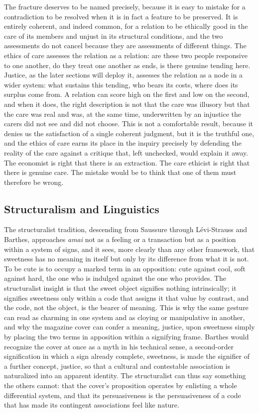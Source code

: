The fracture deserves to be named precisely, because it is easy to mistake for a contradiction to be resolved when it is in fact a feature to be preserved. It is entirely coherent, and indeed common, for a relation to be ethically good in the care of its members and unjust in its structural conditions, and the two assessments do not cancel because they are assessments of different things. The ethics of care assesses the relation as a relation: are these two people responsive to one another, do they treat one another as ends, is there genuine tending here. Justice, as the later sections will deploy it, assesses the relation as a node in a wider system: what sustains this tending, who bears its costs, where does its surplus come from. A relation can score high on the first and low on the second, and when it does, the right description is not that the care was illusory but that the care was real and was, at the same time, underwritten by an injustice the carers did not see and did not choose. This is not a comfortable result, because it denies us the satisfaction of a single coherent judgment, but it is the truthful one, and the ethics of care earns its place in the inquiry precisely by defending the reality of the care against a critique that, left unchecked, would explain it away. The economist is right that there is an extraction. The care ethicist is right that there is genuine care. The mistake would be to think that one of them must therefore be wrong.

\subsection{Structuralism and Linguistics}

The structuralist tradition, descending from Saussure through Lévi-Strauss and Barthes, approaches \textit{amai} not as a feeling or a transaction but as a position within a system of signs, and it sees, more clearly than any other framework, that sweetness has no meaning in itself but only by its difference from what it is not. To be cute is to occupy a marked term in an opposition: cute against cool, soft against hard, the one who is indulged against the one who provides. The structuralist insight is that the sweet object signifies nothing intrinsically; it signifies sweetness only within a code that assigns it that value by contrast, and the code, not the object, is the bearer of meaning. This is why the same gesture can read as charming in one system and as cloying or manipulative in another, and why the magazine cover can confer a meaning, justice, upon sweetness simply by placing the two terms in apposition within a signifying frame. Barthes would recognize the cover at once as a myth in his technical sense, a second-order signification in which a sign already complete, sweetness, is made the signifier of a further concept, justice, so that a cultural and contestable association is naturalized into an apparent identity. The structuralist can thus say something the others cannot: that the cover's proposition operates by enlisting a whole differential system, and that its persuasiveness is the persuasiveness of a code that has made its contingent associations feel like nature.

